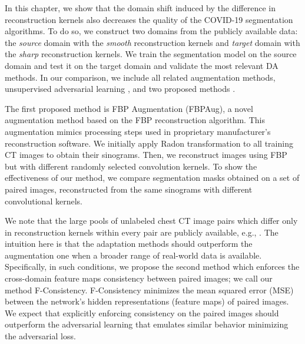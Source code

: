 In this chapter, we show that the domain shift induced by the difference in reconstruction kernels also decreases the quality of the COVID-19 segmentation algorithms. To do so, we construct two domains from the publicly available data: the \textit{source} domain with the \textit{smooth} reconstruction kernels and \textit{target} domain with the \textit{sharp} reconstruction kernels. We train the segmentation model on the source domain and test it on the target domain and validate the most relevant DA methods. In our comparison, we include all related augmentation methods, unsupervised adversarial learning \cite{ganin2015unsupervised}, and two proposed methods \cite{saparov2021zero,shimovolos2022adaptation}.
 
The first proposed method is FBP Augmentation (FBPAug), a novel augmentation method based on the FBP reconstruction algorithm. This augmentation mimics processing steps used in proprietary manufacturer's reconstruction software. We initially apply Radon transformation to all training CT images to obtain their sinograms. Then, we reconstruct images using FBP but with different randomly selected convolution kernels. To show the effectiveness of our method, we compare segmentation masks obtained on a set of paired images, reconstructed from the same sinograms with different convolutional kernels.%

We note that the large pools of unlabeled chest CT image pairs which differ only in reconstruction kernels within every pair are publicly available, e.g., \cite{morozov2021simplified}. The intuition here is that the adaptation methods should outperform the augmentation one when a broader range of real-world data is available. Specifically, in such conditions, we propose the second method which enforces the cross-domain feature maps consistency between paired images; we call our method F-Consistency. F-Consistency minimizes the mean squared error (MSE) between the network’s hidden representations (feature maps) of paired images. We expect that explicitly enforcing consistency on the paired images should outperform the adversarial learning that emulates similar behavior minimizing the adversarial loss.

